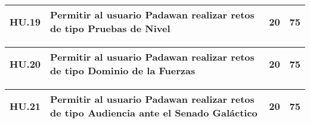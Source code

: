 \begin{table}[h]
	\centering
	\begin{tabular}{| p{2.3cm} | p{5.1cm} | p{2cm} | p{1.6cm} |}
		\hline 
		HU.19 & Permitir al usuario Padawan realizar retos de tipo Pruebas de Nivel & 20 & 75 \\ \hline 
	\end{tabular}
\end{table}   

\begin{table}[h]
	\centering
	\begin{tabular}{| p{2.3cm} | p{5.1cm} | p{2cm} | p{1.6cm} |}
		\hline 
		HU.20 & Permitir al usuario Padawan realizar retos de tipo Dominio de la Fuerzas & 20 & 75 \\ \hline 
	\end{tabular}
\end{table}   

\begin{table}[h]
	\centering
	\begin{tabular}{| p{2.3cm} | p{5.1cm} | p{2cm} | p{1.6cm} |}
		\hline 
		HU.21 & Permitir al usuario Padawan realizar retos de tipo Audiencia ante el Senado Galáctico & 20 & 75 \\ \hline 
	\end{tabular}
\end{table}   

\FloatBarrier        
